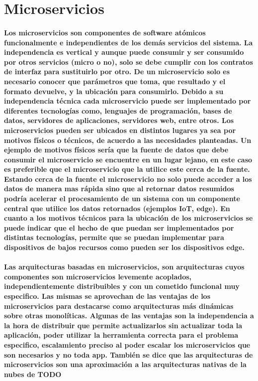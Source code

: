 \section{Microservicios}

\paragraph{
    Los microservicios son componentes de software atómicos funcionalmente e independientes de los demás servicios del sistema. La independencia es vertical y aunque puede consumir y ser consumido por otros servicios (micro o no), solo se debe cumplir con los contratos de interfaz para sustituirlo por otro. De un microservicio solo es necesario conocer que parámetros que toma, que resultado y el formato devuelve, y la ubicación para consumirlo.
    Debido a su independencia técnica cada microservicio puede ser implementado por diferentes tecnologías como, lenguajes de programación, bases de datos, servidores de aplicaciones, servidores web, entre otros. Los microservicios pueden ser ubicados en distintos lugares ya sea por motivos físicos o técnicos, de acuerdo a las necesidades planteadas. Un ejemplo de motivos físicos sería que la fuente de datos que debe consumir el microservicio se encuentre en un lugar lejano, en este caso es preferible que el microservicio que la utilice este cerca de la fuente. Estando cerca de la fuente el microservicio no solo puede acceder a los datos de manera mas rápida sino que al retornar datos resumidos podría acelerar el procesamiento de un sistema con un componente central que utilice los datos retornados (ejemplos IoT, edge). En cuanto a los motivos técnicos para la ubicación de los microservicios se puede indicar que el hecho de que puedan ser implementados por distintas tecnologías, permite que se puedan implementar para dispositivos de bajos recursos como pueden ser los dispositivos edge.
}

\paragraph{
    Las arquitecturas basadas en microservicios, son arquitecturas cuyos componentes son microservicios levemente acoplados, independientemente distribuibles y con un cometido funcional muy especifico. 
    Las mismas se aprovechan de las ventajas de los microservicios para destacarse como arquitecturas más dinámicas sobre otras monolíticas.
    Algunas de las ventajas son la independencia a la hora de distribuir que permite actualizarlos sin actualizar toda la aplicación, poder utilizar la herramienta correcta para el problema especifico, escalamiento preciso al poder escalar los microservicios que son necesarios y no toda app.
    También se dice que las arquitecturas de microservicios son una aproximación a las arquitecturas nativas de la nubes de TODO
}

